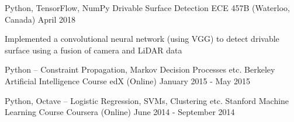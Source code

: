\vspace{-1.0mm}
\vspace{-2mm}
\begin{center}
  \cventry
    {Python, TensorFlow, NumPy}
    {Drivable Surface Detection}
    {ECE 457B (Waterloo, Canada)}
    {April 2018}
    {
      \begin{cvitems}
      \item {Implemented a convolutional neural network (using VGG) to detect drivable surface using a fusion of camera and LiDAR data}
      \end{cvitems}
    }
\end{center}
\begin{center}
  \vspace{-3.0mm}
  \cventry
    {Python – Constraint Propagation, Markov Decision Processes etc.}
    {Berkeley Artificial Intelligence Course}
    {edX (Online)}
    {January 2015 - May 2015}
    {}
\end{center}
\begin{center}
  \vspace{-6.0mm}
  \cventry
    {Python, Octave – Logistic Regression, SVMs, Clustering etc.}
    {Stanford Machine Learning Course}
    {Coursera (Online)}
    {June 2014 - September 2014}
    {}
\end{center}
